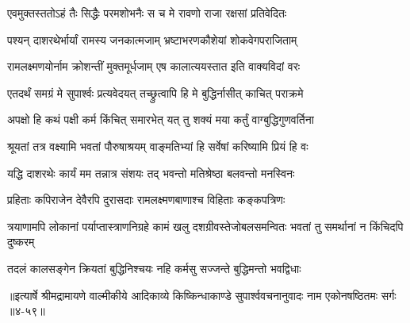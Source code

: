 \twolineshloka
{एवमुक्तस्ततोऽहं तैः सिद्धैः परमशोभनैः}
{स च मे रावणो राजा रक्षसां प्रतिवेदितः} %

\twolineshloka
{पश्यन् दाशरथेर्भार्यां रामस्य जनकात्मजाम्}
{भ्रष्टाभरणकौशेयां शोकवेगपराजिताम्} %

\twolineshloka
{रामलक्ष्मणयोर्नाम क्रोशन्तीं मुक्तमूर्धजाम्}
{एष कालात्ययस्तात इति वाक्यविदां वरः} %

\twolineshloka
{एतदर्थं समग्रं मे सुपार्श्वः प्रत्यवेदयत्}
{तच्छ्रुत्वापि हि मे बुद्धिर्नासीत् काचित् पराक्रमे} %

\twolineshloka
{अपक्षो हि कथं पक्षी कर्म किंचित् समारभेत्}
{यत् तु शक्यं मया कर्तुं वाग्बुद्धिगुणवर्तिना} %

\twolineshloka
{श्रूयतां तत्र वक्ष्यामि भवतां पौरुषाश्रयम्}
{वाङ्मतिभ्यां हि सर्वेषां करिष्यामि प्रियं हि वः} %

\twolineshloka
{यद्धि दाशरथेः कार्यं मम तन्नात्र संशयः}
{तद् भवन्तो मतिश्रेष्ठा बलवन्तो मनस्विनः} %

\twolineshloka
{प्रहिताः कपिराजेन देवैरपि दुरासदाः}
{रामलक्ष्मणबाणाश्च विहिताः कङ्कपत्रिणः} %

\threelineshloka
{त्रयाणामपि लोकानां पर्याप्तास्त्राणनिग्रहे}
{कामं खलु दशग्रीवस्तेजोबलसमन्वितः}
{भवतां तु समर्थानां न किंचिदपि दुष्करम्} %

\twolineshloka
{तदलं कालसङ्गेन क्रियतां बुद्धिनिश्चयः}
{नहि कर्मसु सज्जन्ते बुद्धिमन्तो भवद्विधाः} %


॥इत्यार्षे श्रीमद्रामायणे वाल्मीकीये आदिकाव्ये किष्किन्धाकाण्डे सुपार्श्ववचनानुवादः नाम एकोनषष्ठितमः सर्गः ॥४-५९॥
